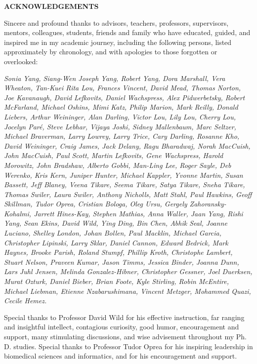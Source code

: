 \begin{centering}
\textbf{ACKNOWLEDGEMENTS}\\
\vspace{\baselineskip}
\end{centering}

Sincere and profound thanks to advisors, teachers, professors, supervisors, mentors, colleagues, students, friends and family who have educated, guided, and inspired me in my academic journey, including the following persons, listed approximately by chronology, and with apologies to those forgotten or overlooked:

\begin{singlespace}
\textit{Sonia Yang, Siang-Wen Joseph Yang, Robert Yang, Dora Marshall,
Vera Wheaton, Tan-Kuei Rita Lou, Frances Vincent, David Mead, Thomas
Norton, Joe Kavanaugh, David Lefkovits, Daniel Wachspress, Alex
Pidwerbetsky, Robert McFarland, Michael Oshins, Mimi Katz, Philip
Marion, Mark Reilly, Donald Liebers, Arthur Weininger, Alan Darling,
Victor Lou, Lily Lou, Cherry Lou, Jocelyn Par\'e, Steve Lebhar,
Vijaya Joshi, Sidney Mallenbaum, Marc Seltzer, Michael Braverman, Larry
Lowrey, Larry Trice, Cary Darling, Rosanne Kho, David Weininger, Craig
James, Jack Delany, Ragu Bharadwaj, Norah MacCuish, John MacCuish, Paul
Scott, Martin Lefkovits, Gene Wachspress, Harold Morowitz, John
Bradshaw, Alberto Gobbi, Man-Ling Lee, Roger Sayle, Deb Werenko, Kris
Kern, Juniper Hunter, Michael Kappler, Yvonne Martin, Susan Bassett,
Jeff Blaney, Veena Tikare, Seema Tikare, Satya Tikare, Sneha Tikare,
Thomas Swiler, Laura Swiler, Anthony Nicholls, Matt Stahl, Paul
Hawkins, Geoff Skillman, Tudor Oprea, Cristian Bologa, Oleg Ursu,
Gergely Zahoransky-Kohalmi, Jarrett Hines-Kay, Stephen Mathias, Anna
Waller, Jaan Yang, Rishi Yang, Sean Ekins, David Wild, Ying Ding, Bin Chen, 
Abhik Seal, Joanne Luciano, Shelley London, Johan Bollen, Paul Macklin, 
Michael Garcia, Christopher Lipinski, Larry Sklar, Daniel Cannon, Edward Bedrick,
Mark Haynes, Brooke Parish, Roland Stumpf, Phillip Kroth, Christophe Lambert,
Stuart Nelson, Praveen Kumar, Jason Timms, Jessica Binder, Joanna Dunn, 
Lars Juhl Jensen, Melinda Gonzalez-Hibner, Christopher Gessner, Joel Duerksen,
Murat Ozturk, Daniel Bieber, Brian Foote, Kyle Stirling, Robin McEntire,  Michael Liebman, Etienne Nzabarushimana, Vincent Metzger, Mohammed Quazi, Cecile Hemez.}
\end{singlespace}

Special thanks to Professor David Wild for his effective instruction, far ranging and insightful intellect, contagious curiosity, good humor, encouragement and support, many stimulating discussions, and wise advisement throughout my Ph. D. studies. Special thanks to Professor Tudor Oprea for his inspiring leadership in biomedical sciences and informatics, and for his encouragement and support. 
